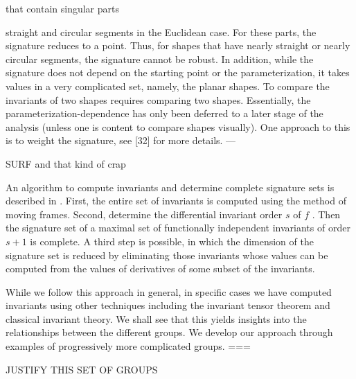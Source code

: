 \documentclass[review,onefignum,onetabnum]{siamonline190516}
\begin{document}
that contain singular parts { straight and circular segments in the Euclidean case. For these
parts, the signature reduces to a point. Thus, for shapes that have nearly straight or nearly
circular segments, the signature cannot be robust. In addition, while the signature does not
depend on the starting point or the parameterization, it takes values in a very complicated set,
namely, the planar shapes. To compare the invariants of two shapes requires comparing two
shapes. Essentially, the parameterization-dependence has only been deferred to a later stage
of the analysis (unless one is content to compare shapes visually). One approach to this is to
weight the signature, see [32] for more details.
---

SURF and that kind of crap


An algorithm to compute invariants and determine complete signature sets is
described in \cite{olver2001}. First, the entire set of invariants is
computed using the method of moving frames. Second, determine the
differential invariant order $s$ of $f$ . Then the signature set of a maximal
set of functionally independent invariants of order $s+1$ is complete. A
third step is possible, in which the dimension of the signature set is
reduced by eliminating those invariants whose values can be computed from the
values of derivatives of some subset of the invariants.

While we follow this approach in general, in specific cases we have computed invariants using other techniques
including the invariant tensor theorem and classical invariant theory. We shall see that this yields insights into the relationships between the different groups. We develop our approach through examples of progressively more complicated groups.
===

JUSTIFY THIS SET OF GROUPS


\begin{figure}
\begin{center}
\end{center}
\end{figure}}
\end{document}
